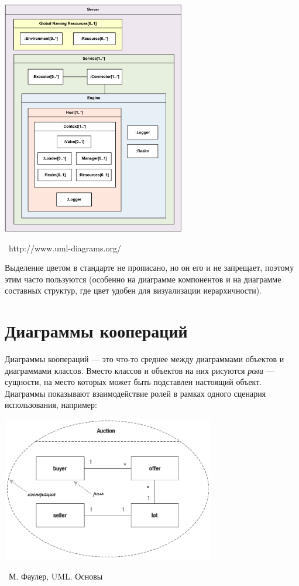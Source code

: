 \documentclass[a5paper]{article}
\newcommand{\attribution}[1] {
	\vspace{-5mm}\begin{flushright}\begin{scriptsize}%
	{\textcopyright\, #1}\end{scriptsize}\end{flushright}
}
\begin{document}
\begin{center}
	\includegraphics[width=0.6\textwidth]{compositeStructureExample.png}
	\attribution{http://www.uml-diagrams.org/}
\end{center}

Выделение цветом в стандарте не прописано, но он его и не запрещает, поэтому этим часто пользуются (особенно на диаграмме компонентов и на диаграмме составных структур, где цвет удобен для визуализации иерархичности).

\section{Диаграммы коопераций}

Диаграммы коопераций --- это что-то среднее между диаграммами объектов и диаграммами классов. Вместо классов и объектов на них рисуются \textit{роли} --- сущности, на место которых может быть подставлен настоящий объект. Диаграммы показывают взаимодействие ролей в рамках одного сценария использования, например:

\begin{center}
	\includegraphics[width=0.7\textwidth]{cooperationDiagram.png}
	\attribution{М. Фаулер, UML. Основы}
\end{center}
\end{document}
